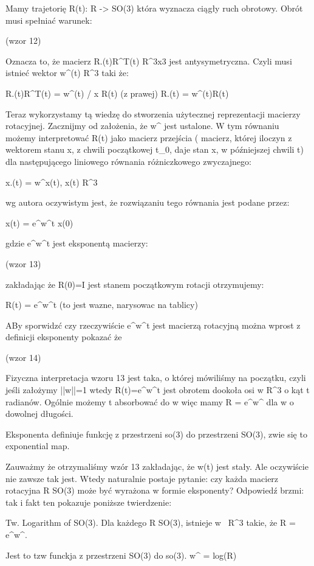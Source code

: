 Mamy trajetorię R(t): R -> SO(3) która wyznacza ciągły ruch obrotowy. Obrót musi spełniać warunek:

(wzor 12)

Oznacza to, że macierz R.(t)R^T(t) \in R^3x3 jest antysymetryczna. Czyli musi istnieć wektor w^(t) \in R^3 taki że:

R.(t)R^T(t) = w^(t) / x R(t) (z prawej)
R.(t) = w^(t)R(t)

Teraz wykorzystamy tą wiedzę do stworzenia użytecznej reprezentacji macierzy rotacyjnej. Zacznijmy od założenia, że w^ jest ustalone. W tym równaniu możemy interpretować R(t) jako macierz przejścia ( macierz, której iloczyn z wektorem stanu x, z chwili początkowej t_0, daje stan x, w późniejszej chwili t) dla następującego liniowego równania różniczkowego zwyczajnego:

x.(t) = w^x(t), x(t) \in R^3

wg autora oczywistym jest, że rozwiązaniu tego równania jest podane przez:

x(t) = e^w^t x(0)

gdzie e^w^t jest eksponentą macierzy:

(wzor 13)

zakładając że R(0)=I jest stanem początkowym rotacji otrzymujemy:

R(t) = e^w^t (to jest wazne, narysowac na tablicy)

ABy sporwidzć czy rzeczywiście e^w^t jest macierzą rotacyjną można wprost z definicji eksponenty pokazać że

(wzor 14)

Fizyczna interpretacja wzoru 13 jest taka, o której mówiliśmy na początku, czyli jeśli założymy ||w||=1 wtedy R(t)=e^w^t jest obrotem dookoła osi w \in R^3 o kąt t radianów. Ogólnie możemy t absorbować do w więc mamy R = e^w^ dla w o dowolnej długości.

Eksponenta definiuje funkcję z przestrzeni so(3) do przestrzeni SO(3), zwie się to exponential map. 

Zauważmy że otrzymaliśmy wzór 13 zakładając, że w(t) jest stały. Ale oczywiście nie zawsze tak jest. Wtedy naturalnie postaje pytanie: czy każda macierz rotacyjna R \in SO(3) może być wyrażona w formie eksponenty? Odpowiedź brzmi: tak i fakt ten pokazuje poniższe twierdzenie:

Tw. Logarithm of SO(3). Dla każdego R \in SO(3), istnieje w \ R^3 takie, że R = e^w^. 

Jest to tzw funckja z przestrzeni SO(3) do so(3). w^ = log(R)

